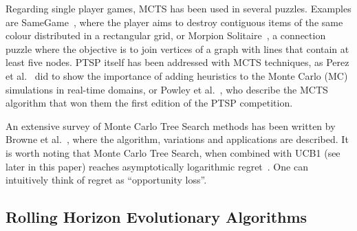 \documentclass{sig-alternate}
\begin{document}
Regarding single player games, MCTS has been used in several puzzles. Examples are SameGame~\cite{Matsumoto2010}, where the player aims to destroy contiguous items of the same colour distributed in a rectangular grid, or Morpion Solitaire~\cite{Edelkamp2010}, a connection puzzle where the objective is to join vertices of a graph with lines that contain at least five nodes. PTSP itself has been addressed with MCTS techniques, as Perez et al.~\cite{Perez2012b} did to show the importance of adding heuristics to the Monte Carlo (MC) simulations in real-time domains, or Powley et al.~\cite{Powley2012}, who describe the MCTS algorithm that won them the first edition of the PTSP competition.

An extensive survey of Monte Carlo Tree Search methods has been written by Browne et al.~\cite{Browne2012}, where the algorithm, variations and applications are described. It is worth noting that Monte Carlo Tree Search, when combined with UCB1 (see later in this paper) reaches asymptotically logarithmic regret~\cite{coquelin2007bandit}. One can intuitively think of regret as ``opportunity loss''.


\vspace{1cm}
\subsection{Rolling Horizon Evolutionary Algorithms}
\end{document}
